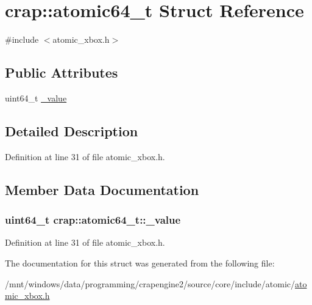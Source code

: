 \hypertarget{structcrap_1_1atomic64__t}{\section{crap\+:\+:atomic64\+\_\+t Struct Reference}
\label{structcrap_1_1atomic64__t}
}


{\ttfamily \#include $<$atomic\+\_\+xbox.\+h$>$}

\subsection*{Public Attributes}
\begin{DoxyCompactItemize}
\item 
uint64\+\_\+t \hyperlink{structcrap_1_1atomic64__t_a4a7e2fa264d91c856718229e0e7d7bc7}{\+\_\+value}
\end{DoxyCompactItemize}


\subsection{Detailed Description}


Definition at line 31 of file atomic\+\_\+xbox.\+h.



\subsection{Member Data Documentation}
\hypertarget{structcrap_1_1atomic64__t_a4a7e2fa264d91c856718229e0e7d7bc7}{
\subsubsection[{\+\_\+value}]{\setlength{\rightskip}{0pt plus 5cm}uint64\+\_\+t crap\+::atomic64\+\_\+t\+::\+\_\+value}}\label{structcrap_1_1atomic64__t_a4a7e2fa264d91c856718229e0e7d7bc7}


Definition at line 31 of file atomic\+\_\+xbox.\+h.



The documentation for this struct was generated from the following file\+:\begin{DoxyCompactItemize}
\item 
/mnt/windows/data/programming/crapengine2/source/core/include/atomic/\hyperlink{atomic__xbox_8h}{atomic\+\_\+xbox.\+h}\end{DoxyCompactItemize}
